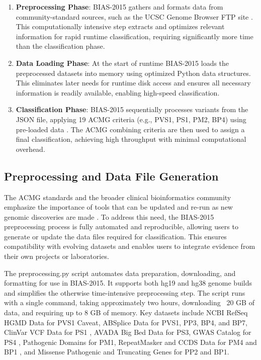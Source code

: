 \documentclass[unnumsec,webpdf,contemporary,large]{oup-authoring-template}
\theoremstyle{thmstyleone}
\theoremstyle{thmstyletwo}
\theoremstyle{thmstylethree}
\begin{document}
\begin{enumerate}
\item \textbf{Preprocessing Phase}: BIAS-2015 gathers and formats data from community-standard sources, such as the UCSC Genome Browser FTP site \cite{kent2002blat}. This computationally intensive step extracts and optimizes relevant information for rapid runtime classification, requiring significantly more time than the classification phase.

\item \textbf{Data Loading Phase}: At the start of runtime BIAS-2015 loads the preprocessed datasets into memory using optimized Python data structures. This eliminates later needs for runtime disk access and ensures all necessary information is readily available, enabling high-speed classification.

\item \textbf{Classification Phase}: BIAS-2015 sequentially processes variants from the JSON file, applying 19 ACMG criteria (e.g., PVS1, PS1, PM2, BP4) using pre-loaded data \cite{richards2015standards}. The ACMG combining criteria are then used to assign a final classification, achieving high throughput with minimal computational overhead.
\end{enumerate}


\subsection{Preprocessing and Data File Generation}
The ACMG standards and the broader clinical bioinformatics community emphasize the importance of tools that can be updated and re-run as new genomic discoveries are made  \cite{elmecky2019variant_reclassification}. To address this need, the BIAS-2015 preprocessing process is fully automated and reproducible, allowing users to generate or update the data files required for classification. This ensures compatibility with evolving datasets and enables users to integrate evidence from their own projects or laboratories.

The preprocessing.py script automates data preparation, downloading, and formatting for use in BIAS-2015. It supports both hg19 and hg38 genome builds and simplifies the otherwise time-intensive preprocessing step. The script runs with a single command, taking approximately two hours, downloading ~20 GB of data, and requiring up to 8 GB of memory. Key datasets include NCBI RefSeq HGMD Data for PVS1 Caveat, ABSplice Data for PVS1, PP3, BP4, and BP7, ClinVar VCF Data for PS1 \cite{landrum2018clinvar}, AVADA Big Bed Data for PS3, GWAS Catalog for PS4 \cite{hindorff2009gwascatalog}, Pathogenic Domains for PM1, RepeatMasker and CCDS Data for PM4 and BP1 \cite{pruitt2014refseq, repeatmasker}, and Missense Pathogenic and Truncating Genes for PP2 and BP1.
\end{document}
